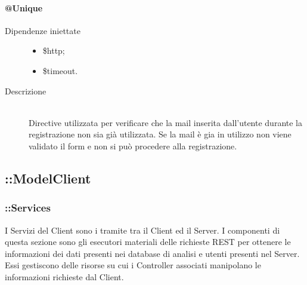 \paragraph{@Unique}
\begin{description}
\item [Dipendenze iniettate] \hfill
\begin{itemize}
	\item \$http;
	\item \$timeout.
\end{itemize}
 \item[Descrizione] \hfill \\
 Directive utilizzata per verificare che la mail inserita dall'utente durante la registrazione non sia già utilizzata.
  Se la mail è gia in utilizzo non viene validato il form e non si può procedere alla registrazione.

\end{description}

\subsection{::ModelClient}

\subsubsection{::Services}
I Servizi del Client sono i tramite tra il Client ed il Server. I componenti di questa sezione sono gli esecutori materiali delle richieste REST per ottenere le informazioni dei dati presenti nei database di analisi e utenti presenti nel Server. Essi gestiscono delle risorse su cui i Controller associati manipolano le informazioni richieste dal Client.

